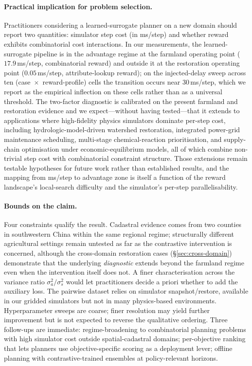\documentclass[11pt]{article}
\begin{document}
\paragraph{Practical implication for problem selection.} Practitioners considering a learned-surrogate planner on a new domain should report two quantities: simulator step cost (in ms/step) and whether reward exhibits combinatorial cost interactions. In our measurements, the learned-surrogate pipeline is in the advantage regime at the farmland operating point ($17.9$\,ms/step, combinatorial reward) and outside it at the restoration operating point ($0.05$\,ms/step, attribute-lookup reward); on the injected-delay sweep across ten (case~$\times$~reward-profile) cells the transition occurs near $30$\,ms/step, which we report as the empirical inflection on these cells rather than as a universal threshold. The two-factor diagnostic is calibrated on the present farmland and restoration evidence and we expect---without having tested---that it extends to applications where high-fidelity physics simulators dominate per-step cost, including hydrologic-model-driven watershed restoration, integrated power-grid maintenance scheduling, multi-stage chemical-reaction prioritisation, and supply-chain optimisation under economic-equilibrium models, all of which combine non-trivial step cost with combinatorial constraint structure. Those extensions remain testable hypotheses for future work rather than established results, and the mapping from ms/step to advantage zone is itself a function of the reward landscape's local-search difficulty and the simulator's per-step parallelisability.

\paragraph{Bounds on the claim.} Four constraints qualify the result. Cadastral evidence comes from two counties in southwestern China within the same regional regime; structurally different agricultural settings remain untested as far as the contrastive intervention is concerned, although the cross-domain restoration cases (\S\ref{sec:cross-domain}) demonstrate that the underlying \emph{diagnostic} extends beyond the farmland regime even when the intervention itself does not. A finer characterisation across the variance ratio $\sigma_a^2 / \sigma_s^2$ would let practitioners decide a priori whether to add the auxiliary loss. The pairwise dataset relies on simulator snapshot/restore, available in our gridded simulators but not in many physics-based environments. Hyperparameter sweeps are coarse; finer resolution may yield further improvement but is not expected to reverse the qualitative ordering. Three follow-ups are immediate: regime-broadening to combinatorial planning problems with high simulator cost outside spatial-cadastral domains; per-objective ranking that lets planners use objective-specific scoring as a deployment lever; offline planning with contrastive-trained ensembles at policy-relevant horizons.
\end{document}

